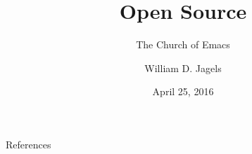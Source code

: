 \documentclass{beamer}
\title{Open Source}
\subtitle{The Church of Emacs}
\author{William D. Jagels}
\institute{Binghamton University}
\date{April 25, 2016}
\begin{document}
\frame{\titlepage}




\begin{frame}[allowframebreaks]{References}
  
  
\end{frame}
\end{document}
